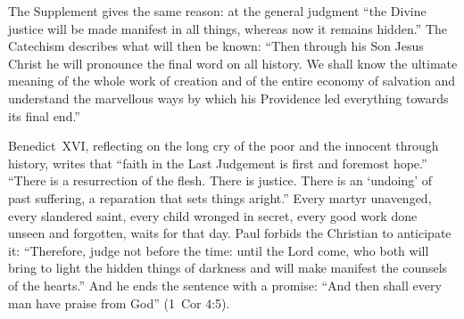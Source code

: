 The Supplement gives the same reason: at the general judgment ``the Divine justice will be made manifest in all things, whereas now it remains hidden.'' The Catechism describes what will then be known: ``Then through his Son Jesus Christ he will pronounce the final word on all history. We shall know the ultimate meaning of the whole work of creation and of the entire economy of salvation and understand the marvellous ways by which his Providence led everything towards its final end.''

Benedict~XVI, reflecting on the long cry of the poor and the innocent through history, writes that ``faith in the Last Judgement is first and foremost hope.'' ``There is a resurrection of the flesh. There is justice. There is an `undoing' of past suffering, a reparation that sets things aright.'' Every martyr unavenged, every slandered saint, every child wronged in secret, every good work done unseen and forgotten, waits for that day. Paul forbids the Christian to anticipate it: ``Therefore, judge not before the time: until the Lord come, who both will bring to light the hidden things of darkness and will make manifest the counsels of the hearts.'' And he ends the sentence with a promise: ``And then shall every man have praise from God'' (1~Cor 4:5).

